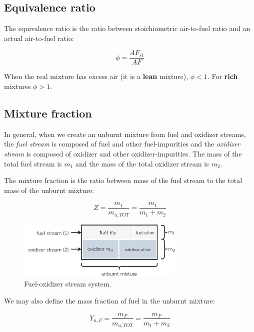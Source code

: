 \documentclass[10pt,twocolumn]{article}
\begin{document}
\subsection{Equivalence ratio}

The equivalence ratio is the ratio between stoichiometric air-to-fuel ratio and an actual air-to-fuel ratio:

\begin{equation}
\phi = \frac{AF_{st}}{AF}
\end{equation}

When the real mixture has excess air (it is a \textbf{lean} mixture), $\phi < 1$. For \textbf{rich} mixtures $\phi > 1$.





\subsection{Mixture fraction}

In general, when we create an unburnt mixture from fuel and oxidizer streams, the \textit{fuel stream} is composed of fuel and other fuel-impurities and the \textit{oxidizer stream} is composed of oxidizer and other oxidizer-impurities. The mass of the total fuel stream is $m_1$ and the mass of the total oxidizer stream is $m_2$.

The mixture fraction is the ratio between mass of the fuel stream to the total mass of the unburnt mixture:

\begin{equation}
Z = \frac{m_1}{m_{u, TOT}} = \frac{m_1}{m_1 + m_2}
\end{equation}

\begin{figure}[H]
\centering\includegraphics[width=8cm]{mixture-fraction.png}
\caption{Fuel-oxidizer stream system.}			
\label{fig:mixture-fraction}
\end{figure}

We may also define the mass fraction of fuel in the unburnt mixture:

\begin{equation}
Y_{u, F} = \frac{m_F}{m_{u, TOT}} = \frac{m_F}{m_1 + m_2}
\end{equation}
\end{document}
